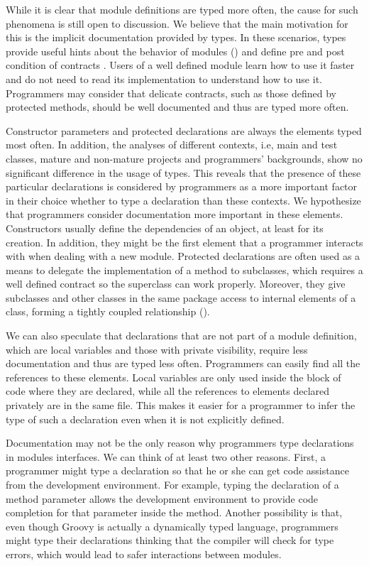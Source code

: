 \documentclass[msc]{ppgccufmg}
\begin{document}
While it is clear that module definitions are typed more often, the cause for such phenomena is still open to discussion.
We believe that the main motivation for this is the implicit documentation provided by types.
In these scenarios, types provide useful hints about the behavior of modules (\cite{Curtis1987}) and define pre and post condition of contracts
\cite{Meyer88, Meijer04, Wadler04, Plosch97, Flanagan2006, Furr09}.
Users of a well defined module learn how to use it faster and do not need to read its implementation to understand how to use it.
Programmers may consider that delicate contracts, such as those defined by protected methods, should be well documented and thus are typed more often.

Constructor parameters and protected declarations are always the elements typed most often.
In addition, the analyses of different contexts, i.e, main and test classes, mature and non-mature projects and programmers' backgrounds, show no significant difference in the usage of types.
This reveals that the presence of these particular declarations is considered by programmers as a more important factor in their choice whether to type a declaration than these contexts.
We hypothesize that programmers consider documentation more important in these elements.
Constructors usually define the dependencies of an object, at least for its creation.
In addition, they might be the first element that a programmer interacts with when dealing with a new module.
Protected declarations are often used as a means to delegate the implementation of a method to subclasses, which requires a well defined contract so the superclass can work properly.
Moreover, they give subclasses and other classes in the same package access to internal elements of a class, forming a tightly coupled relationship (\cite{Chidamber94}).


We can also speculate that declarations that are not part of a module definition, which are local variables and those with private visibility, require less documentation and thus are typed less often.
Programmers can easily find all the references to these elements.
Local variables are only used inside the block of code where they are declared, while all the references to elements declared privately are in the same file.
This makes it easier for a programmer to infer the type of such a declaration even when it is not explicitly defined.

Documentation may not be the only reason why programmers type declarations in modules interfaces.
We can think of at least two other reasons.
First, a programmer might type a declaration so that he or she can get code assistance from the development environment.
For example, typing the declaration of a method parameter allows the development environment to provide code completion for that parameter inside the method.
Another possibility is that, even though Groovy is actually a dynamically typed language, programmers might type their declarations thinking that the compiler will check for type errors, which would lead to safer interactions between modules.
\end{document}
